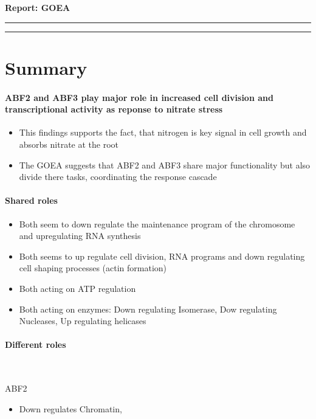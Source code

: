 \documentclass{article}
\begin{document}
	
	\pagestyle{empty}
	\begin{center}
		\LARGE
		\textbf{Report: GOEA} \vspace{0.5cm}
		\hrule
	\end{center}
	\tableofcontents
	\bigskip  
	\bigskip  
	\hrule
	
	\section{Summary}
	
		\paragraph{ABF2 and ABF3 play major role in increased cell division and transcriptional activity as reponse to nitrate stress}
	
		\begin{itemize}
			\item This findings supports the fact, that nitrogen is key signal in cell growth and absorbs nitrate at the root
			\item The GOEA suggests that ABF2 and ABF3 share major functionality but also divide there tasks, coordinating the response cascade 
		\end{itemize}
	
		\paragraph{Shared roles}
			\begin{itemize}
				\item Both seem to down regulate the maintenance program of the chromosome and upregulating RNA synthesis
				\item Both seems to up regulate cell division, RNA programs and down regulating cell shaping processes (actin formation)
				\item Both acting on ATP regulation
				\item Both acting on enzymes: Down regulating Isomerase, Dow regulating Nucleases, Up regulating helicases
			\end{itemize}
		
		\paragraph{Different roles} \
		
			ABF2		
			\begin{itemize}
				\item Down regulates Chromatin, 
			\end{itemize}
			
\end{document}
